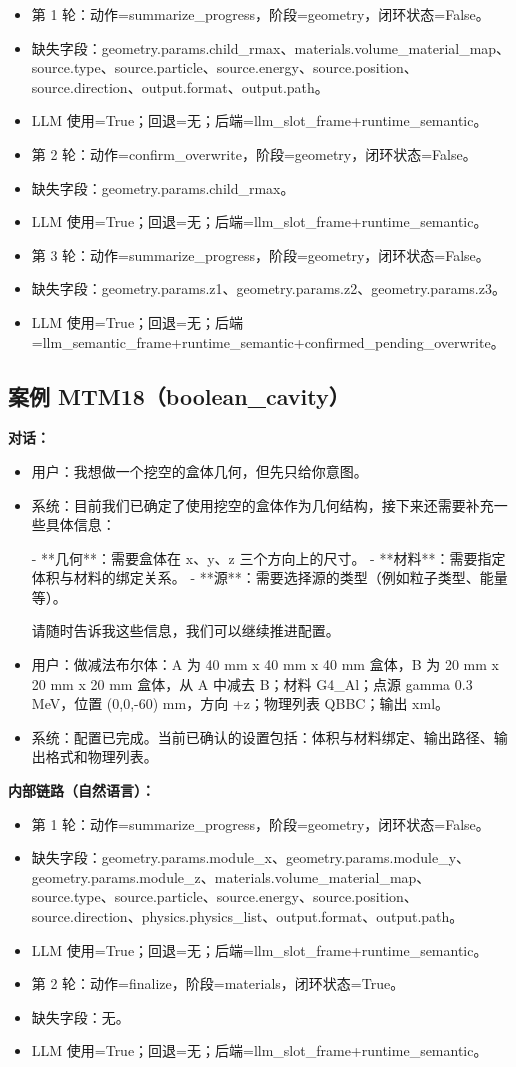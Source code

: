 \documentclass[11pt]{ctexart}
\begin{document}
\begin{itemize}
\item 第 1 轮：动作=summarize\_progress，阶段=geometry，闭环状态=False。
\item 缺失字段：geometry.params.child\_rmax、materials.volume\_material\_map、source.type、source.particle、source.energy、source.position、source.direction、output.format、output.path。
\item LLM 使用=True；回退=无；后端=llm\_slot\_frame+runtime\_semantic。
\item 第 2 轮：动作=confirm\_overwrite，阶段=geometry，闭环状态=False。
\item 缺失字段：geometry.params.child\_rmax。
\item LLM 使用=True；回退=无；后端=llm\_slot\_frame+runtime\_semantic。
\item 第 3 轮：动作=summarize\_progress，阶段=geometry，闭环状态=False。
\item 缺失字段：geometry.params.z1、geometry.params.z2、geometry.params.z3。
\item LLM 使用=True；回退=无；后端=llm\_semantic\_frame+runtime\_semantic+confirmed\_pending\_overwrite。
\end{itemize}
\subsection{案例 MTM18（boolean\_cavity）}
\textbf{对话：}
\begin{itemize}
\item 用户：我想做一个挖空的盒体几何，但先只给你意图。
\item 系统：目前我们已确定了使用挖空的盒体作为几何结构，接下来还需要补充一些具体信息：

- **几何**：需要盒体在 x、y、z 三个方向上的尺寸。
- **材料**：需要指定体积与材料的绑定关系。
- **源**：需要选择源的类型（例如粒子类型、能量等）。

请随时告诉我这些信息，我们可以继续推进配置。
\item 用户：做减法布尔体：A 为 40 mm x 40 mm x 40 mm 盒体，B 为 20 mm x 20 mm x 20 mm 盒体，从 A 中减去 B；材料 G4\_Al；点源 gamma 0.3 MeV，位置 (0,0,-60) mm，方向 +z；物理列表 QBBC；输出 xml。
\item 系统：配置已完成。当前已确认的设置包括：体积与材料绑定、输出路径、输出格式和物理列表。
\end{itemize}
\textbf{内部链路（自然语言）：}
\begin{itemize}
\item 第 1 轮：动作=summarize\_progress，阶段=geometry，闭环状态=False。
\item 缺失字段：geometry.params.module\_x、geometry.params.module\_y、geometry.params.module\_z、materials.volume\_material\_map、source.type、source.particle、source.energy、source.position、source.direction、physics.physics\_list、output.format、output.path。
\item LLM 使用=True；回退=无；后端=llm\_slot\_frame+runtime\_semantic。
\item 第 2 轮：动作=finalize，阶段=materials，闭环状态=True。
\item 缺失字段：无。
\item LLM 使用=True；回退=无；后端=llm\_slot\_frame+runtime\_semantic。
\end{itemize}
\end{document}
